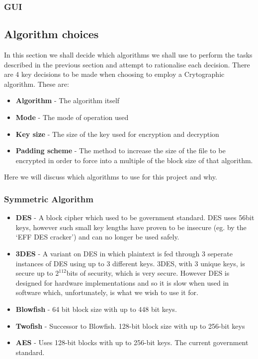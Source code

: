 \documentclass[12pt, titlepage]{article}
\begin{document}
\subsubsection*{GUI}


\subsection{Algorithm choices}
In this section we shall decide which algorithms we shall use to perform the tasks described in the previous section and attempt to rationalise each decision.
\newline \indent There are 4 key decisions to be made when choosing to employ a Crytographic algorithm. These are:
\begin{itemize}
	\item \textbf{Algorithm} - The algorithm itself
	\item \textbf{Mode} - The mode of operation used
	\item \textbf{Key size} - The size of the key used for encryption and decryption
	\item \textbf{Padding scheme} - The method to increase the size of the file to be encrypted in order to force into a multiple of the block size of that algorithm.
\end{itemize}
Here we will discuss which algorithms to use for this project and why.

\subsubsection*{Symmetric Algorithm}
\begin{itemize}
	\item \textbf{DES} - A block cipher which used to be government standard. DES uses 56bit keys, however such small key lengths have proven to be insecure (eg. by the `EFF DES cracker') and can no longer be used safely.
	\item \textbf{3DES} - A variant on DES in which plaintext is fed through 3 seperate instances of DES using up to 3 different keys. 3DES, with 3 unique keys, is secure up to $2^112$bits of security, which is very secure. However DES is designed for hardware implementations and so it is slow when used in software which, unfortunately, is what we wish to use it for.
	\item \textbf{Blowfish} - 64 bit block size with up to 448 bit keys.
	\item \textbf{Twofish} - Successor to Blowfish. 128-bit block size with up to 256-bit keys
	\item \textbf{AES} - Uses 128-bit blocks with up to 256-bit keys. The current government standard.
\end{itemize}
\end{document}
